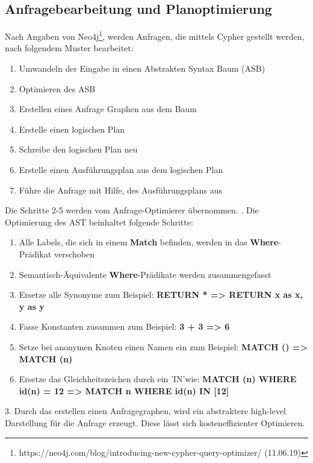 \subsection{Anfragebearbeitung und Planoptimierung}
Nach Angaben von Neo4j\footnote{https://neo4j.com/blog/introducing-new-cypher-query-optimizer/  (11.06.19)}, werden Anfragen, die mittels Cypher gestellt werden, nach folgendem Muster bearbeitet:
\begin{enumerate}
	\item Umwandeln der Eingabe in einen Abstrakten Syntax Baum (ASB)
	\item Optimieren des ASB
	\item Erstellen eines Anfrage Graphen aus dem Baum
	\item Erstelle einen logischen Plan
	\item Schreibe den logischen Plan neu
	\item Erstelle einen Ausführungsplan aus dem logischen Plan
	\item Führe die Anfrage mit Hilfe, des Ausführungsplans aus 
\end{enumerate}
Die Schritte 2-5 werden vom Anfrage-Optimierer übernommen. \newline
{}. Die Optimierung des AST beinhaltet folgende Schritte: 
\begin{enumerate}
	\item Alle Labels, die sich in einem \textbf{Match} befinden, werden in das \textbf{Where}-Prädikat verschoben
	\item  Semantisch-Äquivalente \textbf{Where}-Prädikate werden zusammengefasst
	\item Ersetze alle Synonyme zum Beispiel: \textbf{RETURN * => RETURN x as x, y as y}
	\item Fasse Konstanten zusammen zum Beispiel: \textbf{3 + 3 => 6}
	\item Setze bei anonymen Knoten einen Namen ein zum Beispiel: \textbf{ MATCH () => MATCH (n)}
	\item Ersetze das Gleichheitszeichen durch ein 'IN'wie: \textbf{MATCH (n) WHERE id(n) = 12 => MATCH n WHERE id(n) IN [12]}
\end{enumerate}
3. Durch das erstellen einen Anfragegraphen, wird ein abstraktere high-level Darstellung für die Anfrage erzeugt. Diese lässt sich kosteneffizienter Optimieren.	 \newline \newline
